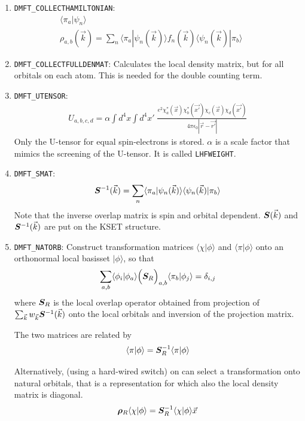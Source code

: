 \documentclass[11pt,a4paper]{report}
\begin{document}
\begin{enumerate}
\item \verb|DMFT_COLLECTHAMILTONIAN|:
\begin{eqnarray}
\langle\pi_a|\psi_n\rangle&&
\\
\rho_{a,b}(\vec{k})=\sum_n
\langle\pi_a|\psi_n(\vec{k})\rangle f_n(\vec{k})
\langle\psi_n(\vec{k})|\pi_b\rangle
\end{eqnarray}
%
\item \verb|DMFT_COLLECTFULLDENMAT|: Calculates the local density matrix,
  but for all orbitals on each atom. This is needed for the double
  counting term.
%
\item \verb|DMFT_UTENSOR|: 
\begin{eqnarray}
U_{a,b,c,d}=\alpha\int d^4x\int d^4x'\;
\frac{e^2\chi^*_a(\vec{x})\chi^*_b(\vec{x'})\chi_c(\vec{x})\chi_d(\vec{x'})}
{4\pi\epsilon_0|\vec{r}-\vec{r'}|}
\label{eq:defutensordmftobject}
\end{eqnarray}
Only the U-tensor for equal spin-electrons is stored. $\alpha$ is a
scale factor that mimics the screening of the U-tensor. It is called
\verb|LHFWEIGHT|.
%
\item \verb|DMFT_SMAT|:
\begin{eqnarray}
\bm{S}^{-1}(\vec{k})
=\sum_n\langle\pi_a|\psi_n(\vec{k})\rangle\langle\psi_n(\vec{k})|\pi_b\rangle
\end{eqnarray}
Note that the inverse overlap matrix is spin and orbital dependent.
$\bm{S}(\vec{k})$ and $\bm{S}^{-1}(\vec{k})$ are put on the KSET
structure.
%
\item \verb|DMFT_NATORB|: Construct transformation matrices
  $\langle\chi|\phi\rangle$ and $\langle\pi|\phi\rangle$ onto an
  orthonormal local basisset $|\phi\rangle$, so that 
\begin{eqnarray}
\sum_{a,b}
\langle\phi_i|\phi_a\rangle\Bigl(\bm{S}_R\Bigr)_{a,b}
\langle\pi_b|\phi_j\rangle=\delta_{i,j}
\end{eqnarray}
where $\bm{S}_R$ is the local overlap operator obtained from
projection of $\sum_{\vec{k}} w_{\vec{k}}\bm{S}^{-1}(\vec{k})$ onto the
local orbitals and inversion of the projection matrix.

The two matrices are related by
\begin{eqnarray}
\langle\pi|\phi\rangle=\bm{S}^{-1}_R\langle\pi|\phi\rangle
\end{eqnarray}

Alternatively, (using a hard-wired switch) on can select a
transformation onto natural orbitals, that is a representation for
which also the local density matrix is diagonal.
\begin{eqnarray}
\bm{\rho}_R\langle\chi|\phi\rangle=\bm{S}^{-1}_R
\langle\chi|\phi\rangle \vec{x}
\end{eqnarray}


\end{enumerate}
\end{document}
